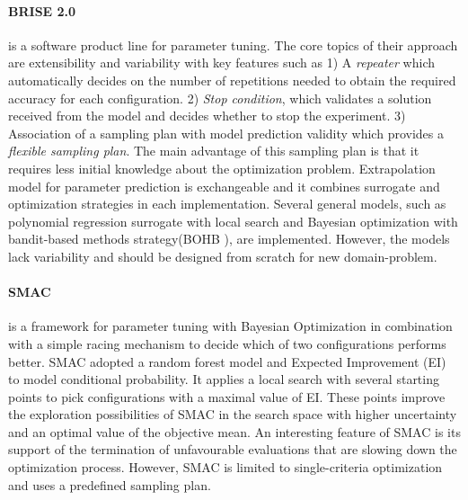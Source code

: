 
        \paragraph{BRISE 2.0}\label{alg:BRISE} \cite{Pukhkaiev19} is a software product line for parameter tuning. The core topics of their approach are extensibility and variability with key features such as 1) A \emph{repeater} which automatically decides on the number of repetitions needed to obtain the required accuracy for each configuration. 2) \emph{Stop condition}, which validates a solution received from the model and decides whether to stop the experiment. 3) Association of a sampling plan with model prediction validity which provides a \emph{flexible sampling plan}. The main advantage of this sampling plan is that it requires less initial knowledge about the optimization problem.
        Extrapolation model for parameter prediction is exchangeable and it combines surrogate and optimization strategies in each implementation. Several general models, such as polynomial regression surrogate with local search and Bayesian optimization with bandit-based methods strategy(BOHB \cite{FalknerBOHB}), are implemented.  However, the models lack variability and should be designed from scratch for new domain-problem.

        \paragraph{SMAC} \cite{HutterHL11, smac-2017} is a framework for parameter tuning with Bayesian Optimization in combination with a simple racing mechanism to decide which of two configurations performs better.
        SMAC adopted a random forest model and Expected Improvement (EI) to model conditional probability. It applies a local search with several starting points to pick configurations with a maximal value of EI. These points improve the exploration possibilities of SMAC in the search space with higher uncertainty and an optimal value of the objective mean. 
        An interesting feature of SMAC is its support of the termination of unfavourable evaluations that are slowing down the optimization process. However, SMAC is limited to single-criteria optimization and uses a predefined sampling plan.

